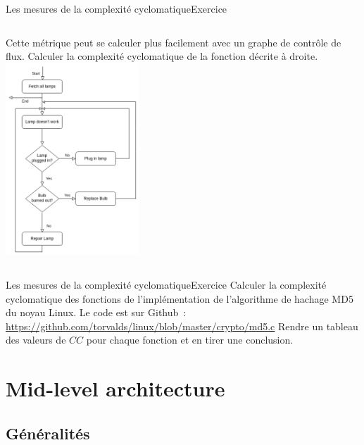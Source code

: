\documentclass{beamer}
\begin{document}
    \begin{frame}[fragile]{Les mesures de la complexité cyclomatique}{Exercice \execcounterdispinc{}}
        \begin{columns}
            Cette métrique peut se calculer plus facilement avec un graphe de contrôle de flux.
            \bigbreak
            Calculer la complexité cyclomatique de la fonction décrite à droite.
            \centering
            \includegraphics[width=5cm]{image/flux-diagram.drawio}
        \end{columns}
    \end{frame}

    \begin{frame}[fragile]{Les mesures de la complexité cyclomatique}{Exercice \execcounterdispinc{}}
        Calculer la complexité cyclomatique des fonctions de l'implémentation de l'algorithme de hachage MD5 du noyau Linux.
        \bigbreak
        Le code est sur Github~: \url{https://github.com/torvalds/linux/blob/master/crypto/md5.c}
        \bigbreak
        Rendre un tableau des valeurs de $CC$ pour chaque fonction et en tirer une conclusion.
    \end{frame}


    \section{Mid-level architecture}\label{sec:mid-level-architecture}

    \subsection{Généralités}\label{subsec:mid-level-generalites}
\end{document}
